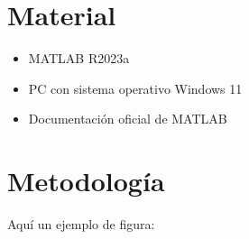 \documentclass[12pt,a4paper]{article}
\begin{document}
\section{Material}
\begin{itemize}
    \item MATLAB R2023a
    \item PC con sistema operativo Windows 11
    \item Documentación oficial de MATLAB
\end{itemize}

\section{Metodología}
Aquí un ejemplo de figura: 


\end{document}
